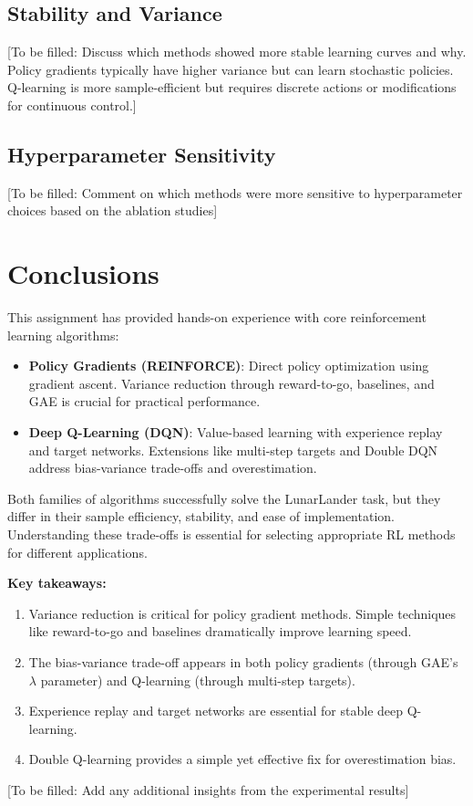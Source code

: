 \documentclass[11pt, a4paper, oneside]{memoir}
\begin{document}
\subsection{Stability and Variance}

[To be filled: Discuss which methods showed more stable learning curves and why. Policy gradients typically have higher variance but can learn stochastic policies. Q-learning is more sample-efficient but requires discrete actions or modifications for continuous control.]

\subsection{Hyperparameter Sensitivity}

[To be filled: Comment on which methods were more sensitive to hyperparameter choices based on the ablation studies]

\section{Conclusions}

This assignment has provided hands-on experience with core reinforcement learning algorithms:
\begin{itemize}
\item \textbf{Policy Gradients (REINFORCE)}: Direct policy optimization using gradient ascent. Variance reduction through reward-to-go, baselines, and GAE is crucial for practical performance.
\item \textbf{Deep Q-Learning (DQN)}: Value-based learning with experience replay and target networks. Extensions like multi-step targets and Double DQN address bias-variance trade-offs and overestimation.
\end{itemize}

Both families of algorithms successfully solve the LunarLander task, but they differ in their sample efficiency, stability, and ease of implementation. Understanding these trade-offs is essential for selecting appropriate RL methods for different applications.

\textbf{Key takeaways:}
\begin{enumerate}
\item Variance reduction is critical for policy gradient methods. Simple techniques like reward-to-go and baselines dramatically improve learning speed.
\item The bias-variance trade-off appears in both policy gradients (through GAE's $\lambda$ parameter) and Q-learning (through multi-step targets).
\item Experience replay and target networks are essential for stable deep Q-learning.
\item Double Q-learning provides a simple yet effective fix for overestimation bias.
\end{enumerate}

[To be filled: Add any additional insights from the experimental results]

\label{LastPage}
\end{document}
